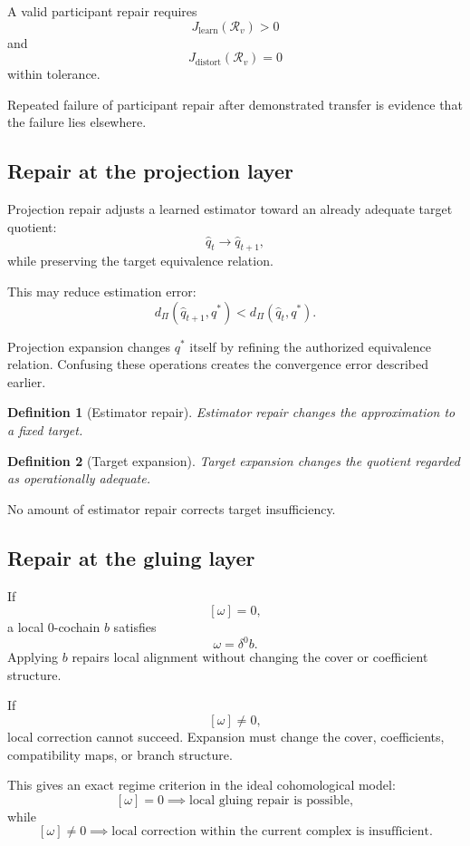 \documentclass[11pt]{article}
\newtheorem{definition}{Definition}[section]
\theoremstyle{definition}
\begin{document}
A valid participant repair requires
\[
J_{\mathrm{learn}}(\mathcal R_v)>0
\]
and
\[
J_{\mathrm{distort}}(\mathcal R_v)=0
\]
within tolerance.

Repeated failure of participant repair after demonstrated transfer is evidence that the failure lies elsewhere.

\subsection{Repair at the projection layer}

Projection repair adjusts a learned estimator toward an already adequate target quotient:
\[
\widehat q_t
\to
\widehat q_{t+1},
\]
while preserving the target equivalence relation.

This may reduce estimation error:
\[
d_\Pi(\widehat q_{t+1},q^{*})
<
d_\Pi(\widehat q_t,q^{*}).
\]

Projection expansion changes \(q^{*}\) itself by refining the authorized equivalence relation. Confusing these operations creates the convergence error described earlier.

\begin{definition}[Estimator repair]
Estimator repair changes the approximation to a fixed target.
\end{definition}

\begin{definition}[Target expansion]
Target expansion changes the quotient regarded as operationally adequate.
\end{definition}

No amount of estimator repair corrects target insufficiency.

\subsection{Repair at the gluing layer}

If
\[
[\omega]=0,
\]
a local \(0\)-cochain \(b\) satisfies
\[
\omega=\delta^0b.
\]
Applying \(b\) repairs local alignment without changing the cover or coefficient structure.

If
\[
[\omega]\neq0,
\]
local correction cannot succeed. Expansion must change the cover, coefficients, compatibility maps, or branch structure.

This gives an exact regime criterion in the ideal cohomological model:
\[
[\omega]=0
\implies
\text{local gluing repair is possible},
\]
while
\[
[\omega]\neq0
\implies
\text{local correction within the current complex is insufficient}.
\]
\end{document}
